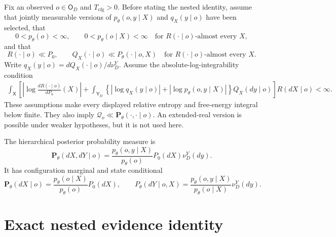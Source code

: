 Fix an observed \(o\in\mathsf O_D\) and \(T_{\mathrm{cfg}}>0\). Before stating the nested identity, assume that jointly measurable versions of \(p_\theta(o,y\mid X)\) and \(q_X(y\mid o)\) have been selected, that
\begin{equation}
0<p_\theta(o)<\infty,
\qquad
0<p_\theta(o\mid X)<\infty
\quad\text{for \(R(\mathord\cdot\mid o)\)-almost every \(X\)},
\label{eq:hierarchical-positive-evidence-assumptions}
\end{equation}
and that
\begin{equation}
R(\mathord\cdot\mid o)\ll P_0,
\qquad
Q_X(\mathord\cdot\mid o)
\ll P_\theta(\mathord\cdot\mid o,X)
\quad\text{for \(R(\mathord\cdot\mid o)\)-almost every \(X\)}.
\label{eq:hierarchical-absolute-continuity-assumptions}
\end{equation}
Write \(q_X(y\mid o)=dQ_X(\mathord\cdot\mid o)/d\nu_D^Y\). Assume the absolute-log-integrability condition
\begin{align}
\int_{\mathsf X}
\left[
\left|\log\frac{dR(\mathord\cdot\mid o)}{dP_0}(X)\right|
+\int_{\mathsf Y_D}
\left\{
|\log q_X(y\mid o)|
+|\log p_\theta(o,y\mid X)|
\right\}Q_X(dy\mid o)
\right]R(dX\mid o)
<\infty.
\label{eq:hierarchical-log-integrability}
\end{align}
These assumptions make every displayed relative entropy and free-energy integral below finite. They also imply
\(\mathcal Q_o\ll\mathbf P_\theta(\mathord\cdot,\mathord\cdot\mid o)\). An extended-real version is possible under weaker hypotheses, but it is not used here.

The hierarchical posterior probability measure is
\begin{equation}
\mathbf P_\theta(dX,dY\mid o)
=\frac{p_\theta(o,y\mid X)}{p_\theta(o)}
P_0(dX)\nu_D^Y(dy).
\label{eq:hierarchical-posterior-measure}
\end{equation}
It has configuration marginal and state conditional
\begin{equation}
\mathbf P_\theta(dX\mid o)
=\frac{p_\theta(o\mid X)}{p_\theta(o)}P_0(dX),
\qquad
P_\theta(dY\mid o,X)
=\frac{p_\theta(o,y\mid X)}{p_\theta(o\mid X)}\nu_D^Y(dy).
\label{eq:hierarchical-posterior-disintegration}
\end{equation}

\section{Exact nested evidence identity}

